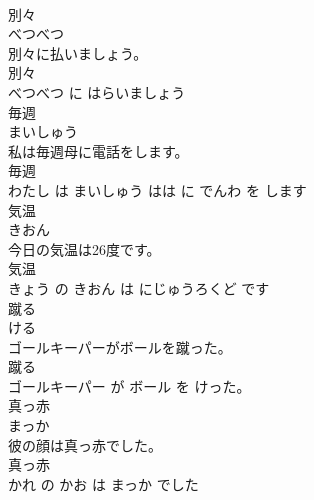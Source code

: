 \documentclass[8pt]{extreport}
\begin{document}
\begin{CJK}{UTF8}{min}
\\	別々	
\\	べつべつ			
\\	別々に払いましょう。	
\\	別々 
\\	べつべつ に はらいましょう			
\\	毎週	
\\	まいしゅう			
\\	私は毎週母に電話をします。	
\\	毎週 
\\	わたし は まいしゅう はは に でんわ を します			
\\	気温	
\\	きおん			
\\	今日の気温は26度です。	
\\	気温 
\\	きょう の きおん は にじゅうろくど です			
\\	蹴る	
\\	ける			
\\	ゴールキーパーがボールを蹴った。	
\\	蹴る 
\\	ゴールキーパー が ボール を けった。			
\\	真っ赤	
\\	まっか			
\\	彼の顔は真っ赤でした。	
\\	真っ赤 
\\	かれ の かお は まっか でした			
\end{CJK}
\end{document}
